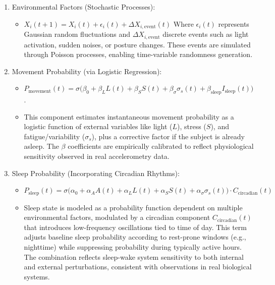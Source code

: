 \documentclass[conference]{IEEEtran}
\begin{document}
\begin{enumerate}
\item Environmental Factors (Stochastic Processes):
    \begin{itemize}
    \item $X_i(t+1) = X_i(t) + \epsilon_i(t) + \Delta X_{i,\text{event}}(t)$ 
    Where \(\epsilon_i(t)\) represents Gaussian random fluctuations and \(\Delta X_{i,\text{event}}\) discrete events such as light activation, sudden noises, or posture changes. These events are simulated through Poisson processes, enabling time-variable randomness generation.
    \end{itemize}
    
\item Movement Probability (via Logistic Regression):
    \begin{itemize}
    \item \(P_{\text{movement}}(t) = \sigma\big( \beta_0 + \beta_L L(t) + \beta_S S(t) + \beta_\sigma \sigma_s(t) + \beta_{\text{sleep}} I_{\text{sleep}}(t) \big)\).
    \item This component estimates instantaneous movement probability as a logistic function of external variables like light (\(L\)), stress (\(S\)), and fatigue/variability (\(\sigma_s\)), plus a corrective factor if the subject is already asleep. The \(\beta\) coefficients are empirically calibrated to reflect physiological sensitivity observed in real accelerometry data.
    \end{itemize}
    
\item Sleep Probability (Incorporating Circadian Rhythms):
    \begin{itemize}
    \item \(P_{\text{sleep}}(t) = \sigma\big( \alpha_0 + \alpha_A A(t) + \alpha_L L(t) + \alpha_S S(t) + \alpha_\sigma \sigma_s(t) \big) \cdot C_{\text{circadian}}(t)\)
    \item Sleep state is modeled as a probability function dependent on multiple environmental factors, modulated by a circadian component \(C_{\text{circadian}}(t)\) that introduces low-frequency oscillations tied to time of day. This term adjusts baseline sleep probability according to rest-prone windows (e.g., nighttime) while suppressing probability during typically active hours. The combination reflects sleep-wake system sensitivity to both internal and external perturbations, consistent with observations in real biological systems.
    \end{itemize}
\end{enumerate}
\end{document}

